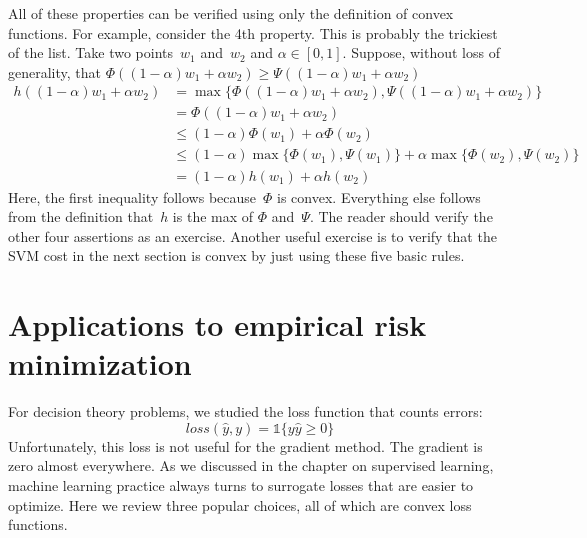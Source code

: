 \documentclass{tufte-book}
\begin{document}
All of these properties can be verified using only the definition of
convex functions. For example, consider the 4th property. This is
probably the trickiest of the list. Take two points~\(w_1\) and~\(w_2\)
and \(\alpha \in [0,1]\). Suppose, without loss of generality, that
\(\Phi((1-\alpha)w_1+ \alpha w_2) \geq \Psi((1-\alpha) w_1 + \alpha w_2)\)
\[
\begin{aligned}
    h((1-\alpha) w_1 + \alpha w_2) &= \max \{\Phi((1- \alpha) w_1+ \alpha w_2),\Psi((1-\alpha) w_1 + \alpha w_2)\}\\
    &= \Phi((1-\alpha) w_1+ \alpha w_2)\\
    & \leq  (1-\alpha) \Phi(w_1)+ \alpha \Phi(w_2)\\
    &\leq (1-\alpha) \max\{\Phi(w_1),\Psi(w_1)\} + \alpha \max\{\Phi(w_2),\Psi(w_2)\}\\
    & = (1-\alpha) h(w_1) + \alpha h(w_2)
\end{aligned}
\] Here, the first inequality follows because~\(\Phi\) is convex.
Everything else follows from the definition that~\(h\) is the max of
\(\Phi\) and~\(\Psi\). The reader should verify the other four
assertions as an exercise. Another useful exercise is to verify that the
SVM cost in the next section is convex by just using these five basic
rules.

\hypertarget{applications-to-empirical-risk-minimization}{%
\section{Applications to empirical risk
minimization}\label{applications-to-empirical-risk-minimization}}

For decision theory problems, we studied the loss function that counts
errors: \[
    \mathit{loss}(\hat{y},y) = \mathbb{1}\{ y\hat{y} \geq 0\}
\] Unfortunately, this loss is not useful for the gradient method. The
gradient is zero almost everywhere. As we discussed in the chapter on
supervised learning, machine learning practice always turns to surrogate
losses that are easier to optimize. Here we review three popular
choices, all of which are convex loss functions.
\end{document}
